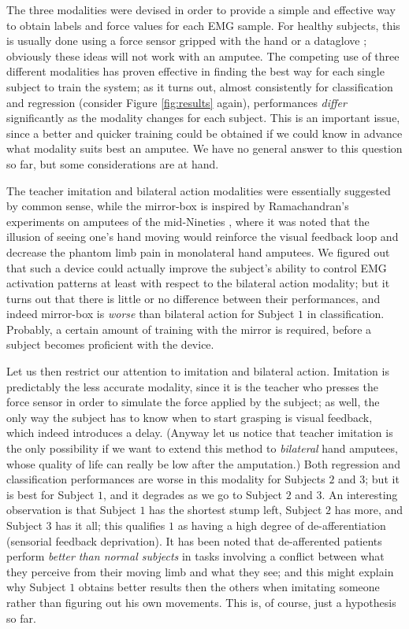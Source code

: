 \documentclass[review,authoryear]{elsarticle}
\renewcommand{\cite}{\citep}
\begin{document}
The three modalities were devised in order to provide a simple and effective
way to obtain labels and force values for each EMG sample. For healthy
subjects, this is usually done using a force sensor gripped with the hand
\cite{2008.BioCyb} or a dataglove \cite{sebelius}; obviously these ideas
will not work with an amputee.
The competing use of three different modalities has proven effective in finding
the best way for each single subject to train the system; as it turns out,
almost consistently for classification and regression (consider Figure
\ref{fig:results} again), performances \emph{differ} significantly as
the modality changes for each subject. This is an important issue, since
a better and quicker training could be obtained if we could
know in advance what modality suits best an amputee. We have no general
answer to this question so far, but some considerations are at hand.

The teacher imitation and bilateral action
modalities were essentially suggested by common sense, while the mirror-box
is inspired by Ramachandran's experiments on amputees of the
mid-Nineties \cite{ramachandran96}, where it was noted that the illusion of
seeing one's hand moving would reinforce the visual feedback loop and decrease
the phantom limb pain in monolateral hand amputees. We figured out that such
a device could actually improve the subject's ability to control EMG
activation patterns at least with respect to the bilateral action modality;
but it turns out that there is little or no difference between their performances,
and indeed mirror-box is \emph{worse} than bilateral action for Subject $1$ in
classification. Probably, a certain amount of training with the mirror is required,
before a subject becomes proficient with the device.

Let us then restrict our attention to imitation and bilateral action.
Imitation is predictably the less accurate modality, since it is the
teacher who presses the force sensor in order to simulate the force applied by the
subject; as well, the only way the subject has to know when to start grasping
is visual feedback, which indeed introduces a delay. (Anyway let us notice that
teacher imitation is the only possibility if we want to extend this method to
\emph{bilateral} hand amputees, whose quality of life can really be low after
the amputation.)
Both regression and classification performances are worse in this modality for Subjects
$2$ and $3$; but it is best for Subject $1$, and it degrades
as we go to Subject $2$ and $3$. An interesting observation is that Subject $1$
has the shortest stump left, Subject $2$ has more, and Subject $3$ has it all;
this qualifies $1$ as having a high degree of de-afferentiation (sensorial
feedback deprivation). It has been noted \cite{lajoie02,miall07}
that de-afferented patients perform \emph{better than normal subjects}
in tasks involving a conflict between what they perceive from their
moving limb and what they see; and this might explain why Subject $1$
obtains better results then the others when imitating someone rather
than figuring out his own movements. This is, of course, just a
hypothesis so far.
\end{document}
